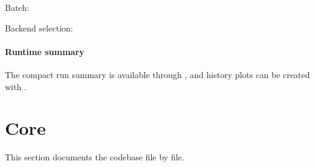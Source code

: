 \documentclass[letterpaper,10pt,english,openany,oneside]{sphinxmanual}
\begin{document}
\sphinxAtStartPar
Batch:

\begin{sphinxVerbatim}[commandchars=\\\{\}]
  \PYG{p}{[}\PYG{p}{[} \PYG{p}{]} \PYG{p}{[} \PYG{p}{]}\PYG{p}{]}
\end{sphinxVerbatim}

\sphinxAtStartPar
Backend selection:

\begin{sphinxVerbatim}[commandchars=\\\{\}]
 
 
 
\end{sphinxVerbatim}


\paragraph{Runtime summary}
\label{\detokenize{api/package/execution/predicting:runtime-summary}}
\sphinxAtStartPar
The compact run summary is available through {\hyperref[\detokenize{api/package/object:nlpoptnet.api.NLPOptNet.summary}]{}}, and history plots can be created with {\hyperref[\detokenize{api/package/object:nlpoptnet.api.NLPOptNet.plot_history}]{}}.

\sphinxstepscope


\section{Core}
\label{\detokenize{api/core/index:core}}\label{\detokenize{api/core/index::doc}}
\sphinxAtStartPar
This section documents the codebase file by file.
\end{document}
